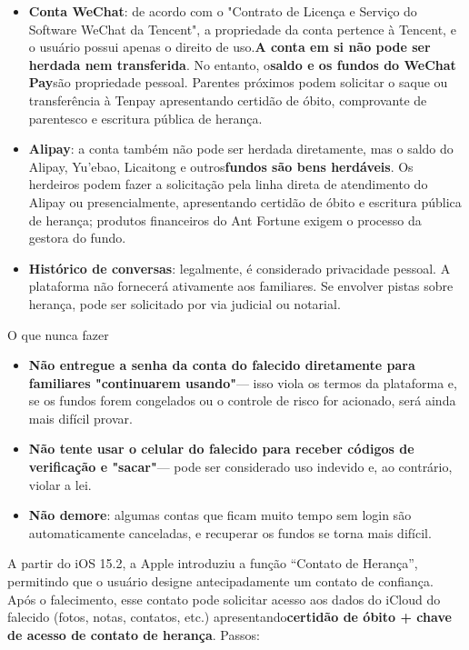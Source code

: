 \begin{itemize}
  \item \textbf{Conta WeChat}: de acordo com o "Contrato de Licença e Serviço do Software WeChat da Tencent", a propriedade da conta pertence à Tencent, e o usuário possui apenas o direito de uso.\textbf{A conta em si não pode ser herdada nem transferida}. No entanto, o\textbf{saldo e os fundos do WeChat Pay}são propriedade pessoal. Parentes próximos podem solicitar o saque ou transferência à Tenpay apresentando certidão de óbito, comprovante de parentesco e escritura pública de herança.
  \item \textbf{Alipay}: a conta também não pode ser herdada diretamente, mas o saldo do Alipay, Yu'ebao, Licaitong e outros\textbf{fundos são bens herdáveis}. Os herdeiros podem fazer a solicitação pela linha direta de atendimento do Alipay ou presencialmente, apresentando certidão de óbito e escritura pública de herança; produtos financeiros do Ant Fortune exigem o processo da gestora do fundo.
  \item \textbf{Histórico de conversas}: legalmente, é considerado privacidade pessoal. A plataforma não fornecerá ativamente aos familiares. Se envolver pistas sobre herança, pode ser solicitado por via judicial ou notarial.
\end{itemize}

\begin{tcbwarn}{O que nunca fazer}
\begin{itemize}
  \item \textbf{Não entregue a senha da conta do falecido diretamente para familiares "continuarem usando"}— isso viola os termos da plataforma e, se os fundos forem congelados ou o controle de risco for acionado, será ainda mais difícil provar.
  \item \textbf{Não tente usar o celular do falecido para receber códigos de verificação e "sacar"}— pode ser considerado uso indevido e, ao contrário, violar a lei.
  \item \textbf{Não demore}: algumas contas que ficam muito tempo sem login são automaticamente canceladas, e recuperar os fundos se torna mais difícil.
\end{itemize}

\end{tcbwarn}


A partir do iOS 15.2, a Apple introduziu a função “Contato de Herança”, permitindo que o usuário designe antecipadamente um contato de confiança. Após o falecimento, esse contato pode solicitar acesso aos dados do iCloud do falecido (fotos, notas, contatos, etc.) apresentando\textbf{certidão de óbito + chave de acesso de contato de herança}. Passos:

